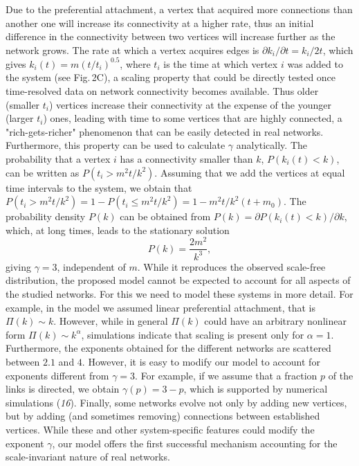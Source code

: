 Due to the preferential attachment, a vertex that acquired more connections than another one will increase its connectivity at a higher rate, thus an initial difference in the connectivity between two vertices will increase further as the network grows. The rate at which a vertex acquires edges is $\partial k_i/{\partial t}=k_i/{2t}$, which gives $k_i(t)=m(t/t_i)^{0.5}$, where $t_i$ is the time at which vertex $i$ was added to the system (see Fig.$\,$2C), a scaling property that could be directly tested once time-resolved data on network connectivity becomes available. Thus older (smaller $t_i$) vertices increase their connectivity at the expense of the younger (larger $t_i$) ones,  leading with time to some vertices that are highly connected, a "rich-gets-richer" phenomenon that can be easily detected in real networks. Furthermore, this property can be used to calculate $\gamma$ analytically. The probability that a vertex $i$ has a connectivity smaller than $k$, $P(k_i(t)<k)$, can be written as $P(t_i>m^2t/k^2)$. Assuming that we add the vertices at equal time intervals to the system, we obtain that $P(t_i>m^2t/k^2)=1-P(t_i\leq m^2t/k^2)=1-m^2t/k^2(t+m_0)$. The probability density $P(k)$ can be obtained from $P(k)=\partial P(k_i(t)<k)/\partial k$, which, at long times, leads to the stationary solution
$$P(k)=\frac{2m^2}{k^3},$$
giving $\gamma=3$, independent of $m$. While it reproduces the observed scale-free distribution, the proposed model cannot be expected to account for all aspects of the studied networks. For this we need to model these systems in more detail. For example, in the model we assumed linear preferential attachment, that is $\Pi(k)\sim k$. However, while in general $\Pi(k)$ could have an arbitrary nonlinear form $\Pi(k)\sim k^\alpha$, simulations indicate that scaling is present only for $\alpha=1$. Furthermore, the exponents obtained for the different networks are scattered between $2.1$ and $4$. However, it is easy to modify our model to account for exponents different from $\gamma=3$. For example, if we assume that a fraction $p$ of the links is directed, we obtain $\gamma(p)=3-p$, which is supported by numerical simulations ({\it 16}). Finally, some networks evolve not only by adding new vertices, but by adding (and sometimes removing) connections between established vertices. While these and other system-specific features could modify the exponent $\gamma$, our model offers the first successful mechanism accounting for the scale-invariant nature of real networks. 



